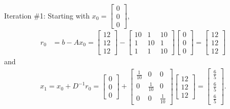 \documentclass[12pt]{article}
\begin{document}
Iteration \#1: Starting with $x_0 = \begin{bmatrix}0 \\ 0 \\ 0 \end{bmatrix}$,
\begin{align*}
    r_0 &= b - Ax_0
    = 
    \begin{bmatrix}
        12 \\[1.5ex]
        12 \\[1.5ex]
        12
    \end{bmatrix} - 
        \begin{bmatrix}
            10  & 1 & 10 \\[1.5ex]
            1  & 10 & 1 \\[1.5ex]
            1  & 1 & 10
        \end{bmatrix}
        \begin{bmatrix} 0 \\[1.5ex] 0 \\[1.5ex] 0 \end{bmatrix}
    =
    \begin{bmatrix}
        12 \\[1.5ex]
        12 \\[1.5ex]
        12
    \end{bmatrix}
\end{align*}
and
\begin{align*}
    x_1 = x_0 + D^{-1}r_0 
    =
    \begin{bmatrix}
        0 \\[1.5ex]
        0 \\[1.5ex]
        0
    \end{bmatrix} + 
        \begin{bmatrix}
            \frac{1}{10}  & 0 & 0 \\[1.5ex]
            0  & \frac{1}{10} & 0 \\[1.5ex]
            0  & 0 & \frac{1}{10}
        \end{bmatrix}
        \begin{bmatrix} 12 \\[1.5ex] 12 \\[1.5ex] 12 \end{bmatrix}
    =
    \begin{bmatrix}
        \frac{6}{5} \\[1.5ex]
        \frac{6}{5} \\[1.5ex]
        \frac{6}{5}
    \end{bmatrix}.
\end{align*}
\end{document}
